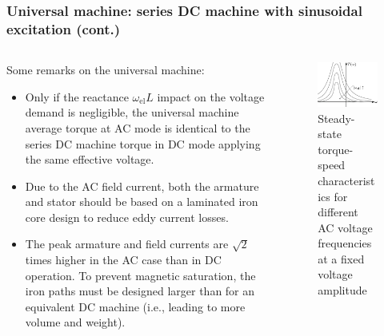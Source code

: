 \begin{frame}
	\frametitle{Universal machine: series DC machine with sinusoidal excitation (cont.)}
	\begin{columns}
		\begin{column}{0.55\textwidth}
		Some remarks on the universal machine:
		\begin{itemize}
			\item Only if the reactance $\omega_\mathrm{el}L$ impact on the voltage demand is negligible, the universal machine average torque at AC mode is identical to the series DC machine torque in DC mode applying the same effective voltage. 
			\item Due to the AC field current, both the armature and stator should be based on a laminated iron core design to reduce eddy current losses.
			\item The peak armature and field currents are $\sqrt{2}$ times higher in the AC case than in DC operation. To prevent magnetic saturation, the iron paths must be designed larger than for an equivalent DC machine (i.e., leading to more volume and weight).
		\end{itemize}
\end{column}
\hfill
\begin{column}{0.45\textwidth}
	\begin{figure}
		\centering
		\includegraphics[scale=1.1]{fig/lec03/Universal_machine_torque_speed.pdf}
		\caption{Steady-state torque-speed characteristics for different AC voltage frequencies at a fixed voltage amplitude}
		\label{fig:Universal_machine_torque_speed}
\end{figure}
\end{column}
\end{columns}
\end{frame}

